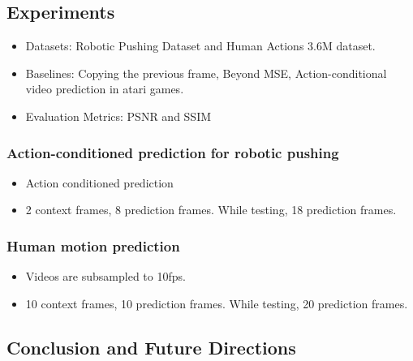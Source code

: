 \documentclass{article}
\begin{document}
    \subsection{Experiments}\label{subsec:Unsupervised_Learning_for_Physical_Interaction_through_Video_Prediction:experiments}
    \begin{itemize}
        \item Datasets: Robotic Pushing Dataset and Human Actions 3.6M dataset.
        \item Baselines: Copying the previous frame, Beyond MSE, Action-conditional video prediction in atari games.
        \item Evaluation Metrics: PSNR and SSIM
    \end{itemize}

    \subsubsection{Action-conditioned prediction for robotic pushing}\label{subsubsec:Unsupervised_Learning_for_Physical_Interaction_through_Video_Prediction:action-conditioned-prediction-for-robotic-pushing}
    \begin{itemize}
        \item Action conditioned prediction
        \item 2 context frames, 8 prediction frames.
        While testing, 18 prediction frames.
    \end{itemize}

    \subsubsection{Human motion prediction}\label{subsubsec:Unsupervised_Learning_for_Physical_Interaction_through_Video_Prediction:human-motion-prediction}
    \begin{itemize}
        \item Videos are subsampled to 10fps.
        \item 10 context frames, 10 prediction frames.
        While testing, 20 prediction frames.
    \end{itemize}

    \subsection{Conclusion and Future Directions}\label{subsec:Unsupervised_Learning_for_Physical_Interaction_through_Video_Prediction:conclusion-and-future-directions}
    \newpage
\end{document}
